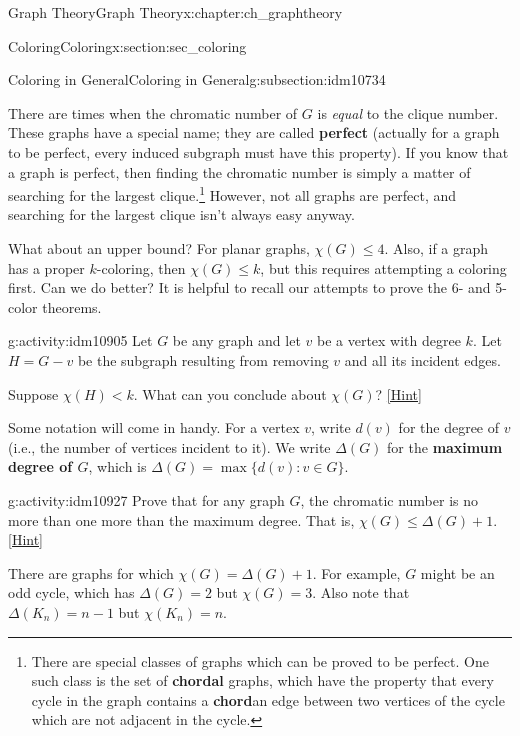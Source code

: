 \documentclass[oneside,10pt,]{book}
\newcommand{\terminology}[1]{\textbf{#1}}
\numberwithin{equation}{chapter}
\def\st{:}
\newcommand{\lt}{<}
\begin{document}
\begin{chapterptx}{Graph Theory}{}{Graph Theory}{}{}{x:chapter:ch_graphtheory}
\begin{sectionptx}{Coloring}{}{Coloring}{}{}{x:section:sec_coloring}
\begin{subsectionptx}{Coloring in General}{}{Coloring in General}{}{}{g:subsection:idm10734}
\par
There are times when the chromatic number of \(G\) is \emph{equal} to the clique number. These graphs have a special name; they are called \terminology{perfect} (actually for a graph to be perfect, every induced subgraph must have this property). If you know that a graph is perfect, then finding the chromatic number is simply a matter of searching for the largest clique.\footnote{There are special classes of graphs which can be proved to be perfect.  One such class is the set of \terminology{chordal} graphs, which have the property that every cycle in the graph contains a \terminology{chord}\textemdash{}an edge between two vertices of the cycle which are not adjacent in the cycle.\label{g:fn:idm10897}} However, not all graphs are perfect, and searching for the largest clique isn't always easy anyway.%
\par
What about an upper bound?  For planar graphs, \(\chi(G) \le 4\).  Also, if a graph has a proper \(k\)-coloring, then \(\chi(G) \le k\), but this requires attempting a coloring first.  Can we do better? It is helpful to recall our attempts to prove the 6- and 5-color theorems.%
\begin{activity}{}{g:activity:idm10905}%
Let \(G\) be any graph and let \(v\) be a vertex with degree \(k\).  Let \(H = G - v\) be the subgraph resulting from removing \(v\) and all its incident edges.%
\par
Suppose \(\chi(H) \lt k\).  What can you conclude about \(\chi(G)\)?%
\space\hspace*{0pt}\hfill{\tiny\hyperlink{g:hint:idm10916-back}{[Hint]}}\end{activity}
Some notation will come in handy.  For a vertex \(v\), write \(d(v)\) for the degree of \(v\) (i.e., the number of vertices incident to it).  We write \(\Delta(G)\) for the \terminology{maximum degree of \(G\)}, which is \(\Delta(G) = \max\{d(v) \st v \in G\}\).%
\begin{activity}{}{g:activity:idm10927}%
Prove that for any graph \(G\), the chromatic number is no more than one more than the maximum degree.  That is, \(\chi(G) \le \Delta(G) + 1\).%
\space\hspace*{0pt}\hfill{\tiny\hyperlink{g:hint:idm10932-back}{[Hint]}}\end{activity}
There are graphs for which \(\chi(G) = \Delta(G) + 1\).  For example, \(G\) might be an odd cycle, which has \(\Delta(G) = 2\) but \(\chi(G) = 3\).  Also note that \(\Delta(K_n) = n-1\) but \(\chi(K_n) = n\).%
\par

\end{subsectionptx}
\end{sectionptx}
\end{chapterptx}
\end{document}
